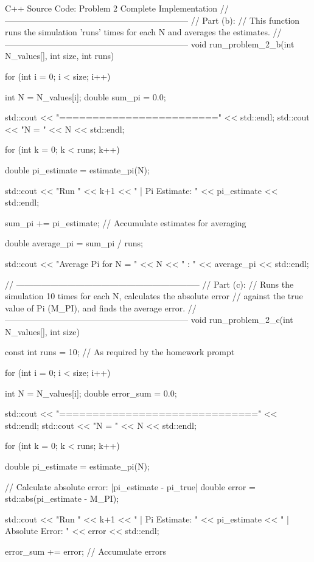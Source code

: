\documentclass{article}
\begin{document}
\begin{codebox}{C++ Source Code: Problem 2 Complete Implementation}
// -----------------------------------------------------------------
// Part (b):
// This function runs the simulation 'runs' times for each N and averages the estimates.
// -----------------------------------------------------------------
void run_problem_2_b(int N_values[], int size, int runs) {

    for (int i = 0; i < size; i++) {
        int N = N_values[i];
        double sum_pi = 0.0;

        std::cout << "========================" << std::endl;
        std::cout << "N = " << N << std::endl;

        for (int k = 0; k < runs; k++) {
            double pi_estimate = estimate_pi(N);

            std::cout << "Run " << k+1
                      << " | Pi Estimate: "
                      << pi_estimate << std::endl;

            sum_pi += pi_estimate; // Accumulate estimates for averaging
        }

        double average_pi = sum_pi / runs;

        std::cout << "Average Pi for N = "
                  << N << " : "
                  << average_pi << std::endl;
    }
}


// -----------------------------------------------------------------
// Part (c):
// Runs the simulation 10 times for each N, calculates the absolute error
// against the true value of Pi (M_PI), and finds the average error.
// -----------------------------------------------------------------
void run_problem_2_c(int N_values[], int size) {
    const int runs = 10; // As required by the homework prompt

    for (int i = 0; i < size; i++) {
        int N = N_values[i];
        double error_sum = 0.0;

        std::cout << "==============================" << std::endl;
        std::cout << "N = " << N << std::endl;

        for (int k = 0; k < runs; k++) {
            double pi_estimate = estimate_pi(N);
            
            // Calculate absolute error: |pi_estimate - pi_true|
            double error = std::abs(pi_estimate - M_PI);

            std::cout << "Run " << k+1
                      << " | Pi Estimate: " << pi_estimate
                      << " | Absolute Error: " << error
                      << std::endl;

            error_sum += error; // Accumulate errors
        }

}}
\end{codebox}
\end{document}
